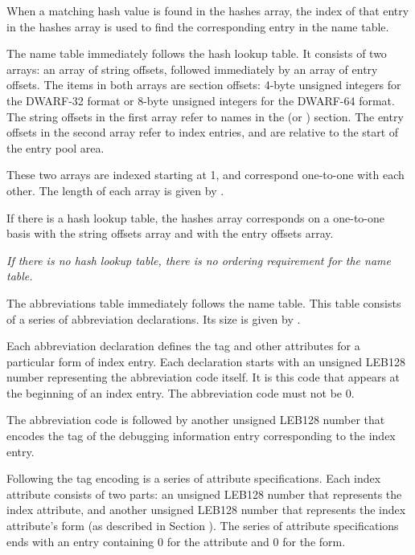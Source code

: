 When a matching hash value is found in the hashes array, the index of
that entry in the hashes array is used to find the corresponding entry
in the name table.

\label{chap:nametable}
The name table immediately follows the hash lookup table. It
consists of two arrays: an array of string offsets, followed
immediately by an array of entry offsets. The items in both
arrays are section offsets: 4-byte unsigned integers for the
DWARF-32 format or 8-byte unsigned integers for the DWARF-64
format. The string offsets in the first array refer to names in
the \dotdebugstr{} (or \dotdebugstrdwo) section. The entry offsets
in the second array refer to index entries, and are relative to
the start of the entry pool area.

These two arrays are indexed starting at 1, and correspond 
one-to-one with each other. The length of each array is
given by \HFNnamecount{}.

If there is a hash lookup table, the hashes array corresponds on
a one-to-one basis with the string offsets array and with the
entry offsets array.

\textit{If there is no hash lookup table, there is no ordering
requirement for the name table.}

The abbreviations table immediately follows the name table. This table
consists of a series of abbreviation declarations. Its size is given
by \HFNabbrevtablesize{}.

Each abbreviation declaration defines the tag and other attributes for
a particular form of index entry. Each declaration starts with an
unsigned LEB128 number representing the abbreviation code itself. It
is this code that appears at the beginning of an index entry. The
abbreviation code must not be 0.

The abbreviation code is followed by another unsigned LEB128 number
that encodes the tag of the debugging information entry corresponding
to the index entry.

Following the tag encoding is a series of attribute specifications.
Each
\bb
index attribute 
\eb
consists of two parts: an unsigned LEB128 number that
represents the index attribute, and another unsigned LEB128 number
that represents the 
\bb
index attribute's 
\eb
form (as described in 
Section ). The series of attribute 
specifications ends with an entry containing 0 for the attribute and 
0 for the form.


